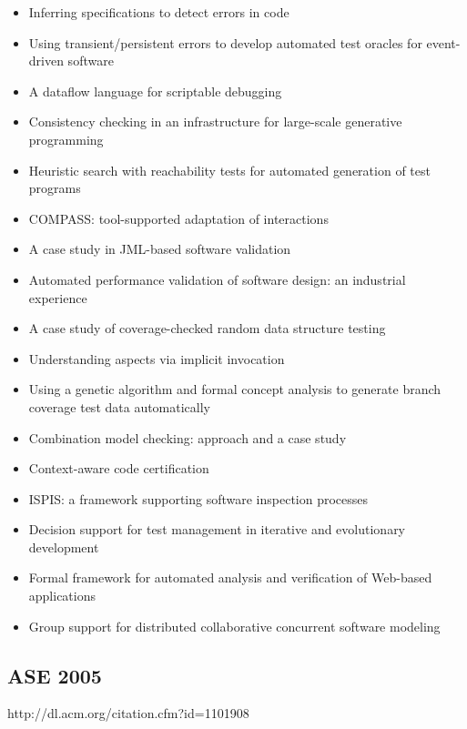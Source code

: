 {\begin{itemize}[itemsep=-1ex]
  \item Inferring specifications to detect errors in code
  \item Using transient/persistent errors to develop automated test oracles for event-driven software
  \item A dataflow language for scriptable debugging
  \item Consistency checking in an infrastructure for large-scale generative programming
  \item Heuristic search with reachability tests for automated generation of test programs
  \item COMPASS: tool-supported adaptation of interactions
  \item A case study in JML-based software validation
  \item Automated performance validation of software design: an industrial experience
  \item A case study of coverage-checked random data structure testing
  \item Understanding aspects via implicit invocation
  \item Using a genetic algorithm and formal concept analysis to generate branch coverage test data automatically
  \item Combination model checking: approach and a case study
  \item Context-aware code certification
  \item ISPIS: a framework supporting software inspection processes
  \item Decision support for test management in iterative and evolutionary development
  \item Formal framework for automated analysis and verification of Web-based applications 
  \item Group support for distributed collaborative concurrent software modeling
\end{itemize}
}

\subsection{ASE 2005}

http://dl.acm.org/citation.cfm?id=1101908


